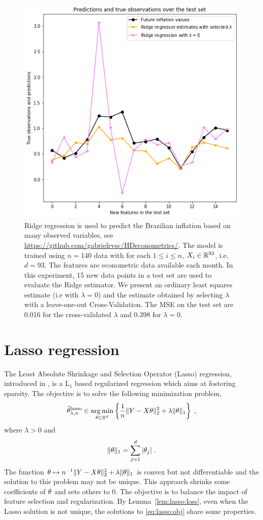\begin{figure}
\begin{center}
\includegraphics[width = .7\linewidth]{./Illustrations/ridge_pred_inflation.png}
\end{center}
\caption{Ridge regression is used to predict the Brazilian inflation based on many observed variables, see \url{https://github.com/gabrielrvsc/HDeconometrics/}. The model is trained using $n=140$ data with for each $1\leqslant i \leqslant n$, $X_i\in\mathbb{R}^{93}$, i.e. $d  =93$. The features are econometric data available each month. In this experiment, 15 new data points in a test set are used to evaluate the Ridge estimator. We present an ordinary least squares estimate (i.e with $\lambda = 0$) and the estimate obtained by selecting $\lambda$ with a leave-one-out Cross-Validation. The MSE on the test set are 0.016 for the cross-validated $\lambda$ and 0.398 for $\lambda = 0$.}
\end{figure}



\section{Lasso regression}
The Least Absolute Shrinkage and Selection Operator (Lasso) regression, introduced in \cite{tibshirani1996regression}, is a $\mathrm{L}_1$ based regularized regression which aims at fostering sparsity. The objective is to solve the following minimization problem,
\begin{equation}
\label{eq:lasso:obj}
\widehat \param^{\mathrm{lasso}}_{\lambda,n}\in  \argmin_{\param\in\rset^d}  \left\{\frac{1}{n}\|Y - X\param\|_2^2 + \lambda\|\param\|_1\right\}\eqsp,
\end{equation}
where $\lambda>0$ and
\[
\|\theta\|_1 = \sum_{j=1}^d|\theta_j|\;.
\]
The function $\theta \mapsto n^{-1}\|Y - X\theta\|_2^2 + \lambda\|\theta\|_1$ is convex but not differentiable and the solution to this problem may  not be unique. This approach shrinks some coefficients of $\theta$ and sets others to 0. The objective is to balance the impact of feature selection and regularization.  By Lemma~\ref{lem:lasso:loss}, even when the Lasso solution is not unique, the solutions to \eqref{eq:lasso:obj} share some properties. 

